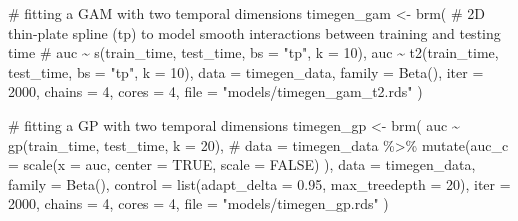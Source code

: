 \documentclass[
  doc,
  floatsintext,
  longtable,
  a4paper,
  nolmodern,
  notxfonts,
  notimes,
  colorlinks=true,linkcolor=blue,citecolor=blue,urlcolor=blue]{apa7}
\newenvironment{Shaded}{\begin{snugshade}}{\end{snugshade}}
\newcommand{\AttributeTok}[1]{\textcolor[rgb]{0.40,0.45,0.13}{#1}}
\newcommand{\CommentTok}[1]{\textcolor[rgb]{0.37,0.37,0.37}{#1}}
\newcommand{\DecValTok}[1]{\textcolor[rgb]{0.68,0.00,0.00}{#1}}
\newcommand{\FloatTok}[1]{\textcolor[rgb]{0.68,0.00,0.00}{#1}}
\newcommand{\FunctionTok}[1]{\textcolor[rgb]{0.28,0.35,0.67}{#1}}
\newcommand{\NormalTok}[1]{\textcolor[rgb]{0.00,0.23,0.31}{#1}}
\newcommand{\OtherTok}[1]{\textcolor[rgb]{0.00,0.23,0.31}{#1}}
\newcommand{\SpecialCharTok}[1]{\textcolor[rgb]{0.37,0.37,0.37}{#1}}
\newcommand{\StringTok}[1]{\textcolor[rgb]{0.13,0.47,0.30}{#1}}
\begin{document}
\begin{Shaded}
\begin{Highlighting}[]
\CommentTok{\# fitting a GAM with two temporal dimensions}
\NormalTok{timegen\_gam }\OtherTok{\textless{}{-}} \FunctionTok{brm}\NormalTok{(}
    \CommentTok{\# 2D thin{-}plate spline (tp) to model smooth interactions between training and testing time}
    \CommentTok{\# auc \textasciitilde{} s(train\_time, test\_time, bs = "tp", k = 10),}
\NormalTok{    auc }\SpecialCharTok{\textasciitilde{}} \FunctionTok{t2}\NormalTok{(train\_time, test\_time, }\AttributeTok{bs =} \StringTok{"tp"}\NormalTok{, }\AttributeTok{k =} \DecValTok{10}\NormalTok{),}
    \AttributeTok{data =}\NormalTok{ timegen\_data,}
    \AttributeTok{family =} \FunctionTok{Beta}\NormalTok{(),}
    \AttributeTok{iter =} \DecValTok{2000}\NormalTok{,}
    \AttributeTok{chains =} \DecValTok{4}\NormalTok{,}
    \AttributeTok{cores =} \DecValTok{4}\NormalTok{,}
    \AttributeTok{file =} \StringTok{"models/timegen\_gam\_t2.rds"}
\NormalTok{    )}

\CommentTok{\# fitting a GP with two temporal dimensions}
\NormalTok{timegen\_gp }\OtherTok{\textless{}{-}} \FunctionTok{brm}\NormalTok{(}
\NormalTok{    auc }\SpecialCharTok{\textasciitilde{}} \FunctionTok{gp}\NormalTok{(train\_time, test\_time, }\AttributeTok{k =} \DecValTok{20}\NormalTok{),}
    \CommentTok{\# data = timegen\_data \%\textgreater{}\% mutate(auc\_c = scale(x = auc, center = TRUE, scale = FALSE) ),}
    \AttributeTok{data =}\NormalTok{ timegen\_data,}
    \AttributeTok{family =} \FunctionTok{Beta}\NormalTok{(),}
    \AttributeTok{control =} \FunctionTok{list}\NormalTok{(}\AttributeTok{adapt\_delta =} \FloatTok{0.95}\NormalTok{, }\AttributeTok{max\_treedepth =} \DecValTok{20}\NormalTok{),}
    \AttributeTok{iter =} \DecValTok{2000}\NormalTok{,}
    \AttributeTok{chains =} \DecValTok{4}\NormalTok{,}
    \AttributeTok{cores =} \DecValTok{4}\NormalTok{,}
    \AttributeTok{file =} \StringTok{"models/timegen\_gp.rds"}
\NormalTok{    )}
\end{Highlighting}
\end{Shaded}
\end{document}
